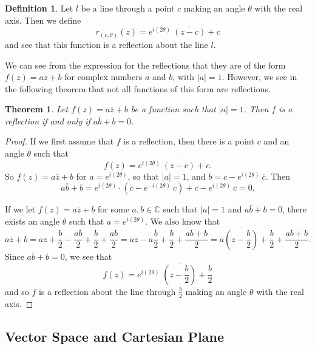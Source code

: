 \documentclass[
]{book}
\newtheorem{theorem}{Theorem}[chapter]
\theoremstyle{definition}
\newtheorem{definition}{Definition}[chapter]
\theoremstyle{definition}
\theoremstyle{definition}
\theoremstyle{definition}
\theoremstyle{remark}
\begin{document}
\begin{definition}
Let \(l\) be a line through a point \(c\) making an angle \(\theta\) with the real axis. Then we define \[r_{(c,\theta)}(z)= e^{i(2\theta )} \: \overline{(z-c)} +c\] and see that this function is a reflection about the line \(l\).
\end{definition}

We can see from the expression for the reflections that they are of the form \(f(z)=a \overline{z}+b\) for complex numbers \(a\) and \(b\), with \(|a|=1\). However, we see in the following theorem that not all functions of this form are reflections.

\begin{theorem}
\protect\hypertarget{thm:complex-reflection}{}\label{thm:complex-reflection}Let \(f(z)=a\overline{z} + b\) be a function such that \(|a|=1\). Then \(f\) is a reflection if and only if \(a\overline{b}+b=0\).
\end{theorem}

\begin{proof}
If we first assume that \(f\) is a reflection, then there is a point \(c\) and an angle \(\theta\) such that \[f(z) = e^{i(2\theta)} \: \overline{(z-c)} +c.\] So \(f(z)=a\overline{z} +b\) for \(a=e^{i(2\theta)}\), so that \(|a|=1\), and \(b= c-e^{i(2\theta)} \: \overline{c}\). Then \[a\overline{b} + b = e^{i(2\theta)} \cdot \left(\overline{c}-e^{-i(2\theta)} \: c\right) + c-e^{i(2\theta)}\: \overline{c}=0.\]

If we let \(f(z)=a\overline{z}+b\) for some \(a,b\in \mathbb{C}\) such that \(|a|=1\) and \(a\overline{b}+b=0\), there exists an angle \(\theta\) such that \(a= e^{i(2\theta)}\). We also know that \[a\overline{z}+b= a\overline{z} + \frac{b}{2}-\frac{a\overline{b}}{2} + \frac{b}{2} + \frac{a\overline{b}}{2} = a \overline{z} - a \frac{\overline{b}}{2} + \frac{b}{2} + \frac{a\overline{b}+b}{2} = a \overline{\left(z-\frac{b}{2}\right)} + \frac{b}{2} + \frac{a\overline{b}+b}{2}.\] Since \(a\overline{b}+b=0\), we see that
\[f(z)=e^{i(2\theta)}\; \overline{\left(z-\frac{b}{2}\right)} + \frac{b}{2}\] and so \(f\) is a reflection about the line through \(\frac{b}{2}\) making an angle \(\theta\) with the real axis.
\end{proof}

\hypertarget{vector-space-and-cartesian-plane}{%
\subsection{Vector Space and Cartesian Plane}\label{vector-space-and-cartesian-plane}}
\end{document}
